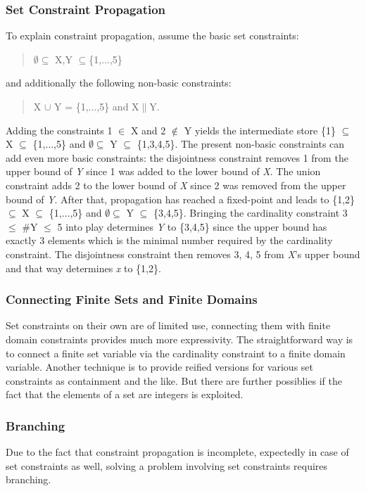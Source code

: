 \documentclass[a4paper,halfparskip]{scrartcl}
\begin{document}
\subsubsection{Set Constraint Propagation}
To explain constraint propagation, assume the basic 
set constraints: 
\begin{quote}
$\emptyset \subseteq$ X,Y $\subseteq$\{1,$\ldots$,5\}
\end{quote}
and additionally the following non-basic constraints:  
\begin{quote}
X $\cup$ Y = \{1,$\ldots$,5\} and X$\parallel$Y.
\end{quote}
Adding the constraints 1 $\in$ X and 2 $\notin$ Y  yields 
the intermediate store \{1\} $\subseteq$ X $\subseteq$ \{1,$\ldots$,5\}
and $\emptyset \subseteq$ Y $\subseteq$ \{1,3,4,5\}. The 
present non-basic constraints can add even more basic 
constraints: the disjointness constraint removes 1 from 
the upper bound of \emph{Y} since 1 was added to the lower bound 
of \emph{X}. The union constraint adds 2 to the lower bound of  
\emph{X} since 2 was removed from the upper bound of \emph{Y}. 
After that, propagation has reached a fixed-point and leads to 
\{1,2\}$\subseteq$ X $\subseteq$ \{1,$\ldots$,5\} and 
$\emptyset \subseteq$ Y $\subseteq$ \{3,4,5\}. 
Bringing the cardinality constraint 3 $\le$ $\#$Y $\le$ 5  
into play determines \emph{Y} to \{3,4,5\} since the upper 
bound has exactly 3 elements which is the minimal number 
required by the cardinality constraint. 
The disjointness constraint then removes 3, 4, 5 from \emph{X}'s 
upper bound and that way determines \emph{x} to \{1,2\}. 

\subsubsection{Connecting Finite Sets and Finite Domains}
Set constraints on their own are of limited use, connecting 
them with finite domain constraints provides much more 
expressivity. The straightforward way is to connect a finite 
set variable via the cardinality constraint to a finite 
domain variable. Another technique is to provide reified 
versions for various set constraints as containment and 
the like. But there are further possiblies if the fact 
that the elements of a set are integers is exploited. 


\subsubsection{Branching}
Due to the fact that constraint propagation is incomplete, 
expectedly in case of set constraints as well, solving a 
problem involving set constraints requires branching. 
\end{document}
